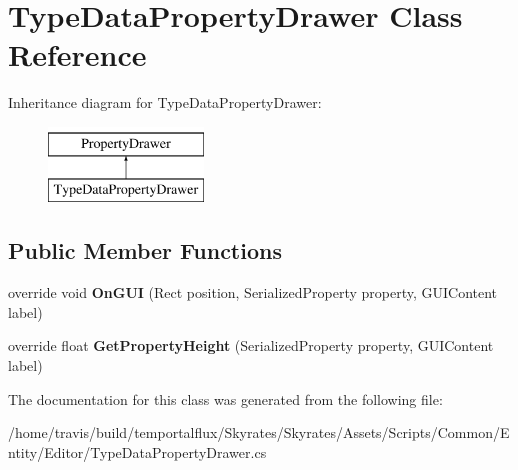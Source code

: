 \hypertarget{class_type_data_property_drawer}{\section{Type\-Data\-Property\-Drawer Class Reference}
\label{class_type_data_property_drawer}
}
Inheritance diagram for Type\-Data\-Property\-Drawer\-:\begin{figure}[H]
\begin{center}
\leavevmode
\includegraphics[height=2.000000cm]{class_type_data_property_drawer}
\end{center}
\end{figure}
\subsection*{Public Member Functions}
\begin{DoxyCompactItemize}
\item 
\hypertarget{class_type_data_property_drawer_a91f8a621156258d647ad4a65e4b78776}{override void {\bfseries On\-G\-U\-I} (Rect position, Serialized\-Property property, G\-U\-I\-Content label)}\label{class_type_data_property_drawer_a91f8a621156258d647ad4a65e4b78776}

\item 
\hypertarget{class_type_data_property_drawer_abae9225835bc1f4b0353bf929e1e3ecb}{override float {\bfseries Get\-Property\-Height} (Serialized\-Property property, G\-U\-I\-Content label)}\label{class_type_data_property_drawer_abae9225835bc1f4b0353bf929e1e3ecb}

\end{DoxyCompactItemize}


The documentation for this class was generated from the following file\-:\begin{DoxyCompactItemize}
\item 
/home/travis/build/temportalflux/\-Skyrates/\-Skyrates/\-Assets/\-Scripts/\-Common/\-Entity/\-Editor/Type\-Data\-Property\-Drawer.\-cs\end{DoxyCompactItemize}
